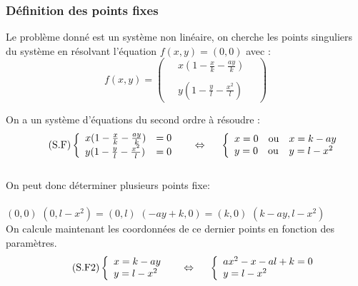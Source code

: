 \documentclass{article}
\begin{document}
\subsubsection{Définition des points fixes}

Le problème donné est un système non linéaire, on cherche les points singuliers du système en résolvant l'équation $f(x,y) = (0,0) $ avec :
\begin{equation*}
    f(x,y) = 
    \begin{pmatrix}
        \quad x(1 - \frac{x}{k} - \frac{a y}{k})\phantom{\quad}\\\\
        \quad y(1- \frac{y}{l} - \frac{x^{2}}{l})\phantom{\quad}
    \end{pmatrix}
\end{equation*}

\vspace{0.5cm}
On a un système d'équations du second ordre à résoudre :\\
\begin{equation}
\label{eq:f1}
\tag{S.F}
\left\{
    \begin{array}{ll}
        x(1 - \frac{x}{k} - \frac{a y}{k}) & = 0 \\
        y(1- \frac{y}{l} - \frac{x^{2}}{l}) & = 0
    \end{array}
\right.
\hspace{0.5cm}
\Leftrightarrow
\hspace{0.5cm}
\left\{
    \begin{array}{ll}
        x = 0 \quad \text{ou} & x = k - a y \\
        y = 0 \quad \text{ou} & y = l - x^2
    \end{array}
\right.
\end{equation}\\

\vspace{0.5cm}
On peut donc déterminer plusieurs points fixe:\\\\
\phantom{}\hfill $(0,0)$ \hfill $(0,l - x^2) = (0,l)$ \hfill $(- a y + k,0) = (k,0)$ \hfill $(k - a y, l - x^{2})$ \hfill \phantom{}\\

\vspace{0,5cm}
On calcule maintenant les coordonnées de ce dernier points en fonction des paramètres.\\
\begin{equation}
\label{eq:f2}
\tag{S.F2}
\left\{
    \begin{array}{l}
        x = k - ay \\
        y = l - x^{2}
    \end{array}
\right.
\hspace{0.5cm}
\Leftrightarrow
\hspace{0.5cm}
\left\{
    \begin{array}{l}
        ax^{2} - x - al + k = 0\\
        y = l - x^{2}
    \end{array}
\right.
\end{equation}\\
\vspace{0,5cm}
\end{document}
